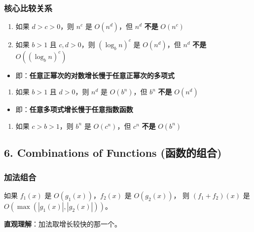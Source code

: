 \documentclass[10pt,a4paper,openany]{ctexbook}
\theoremstyle{definition}
\theoremstyle{remark}
\renewenvironment{quote}
  {\list{}{\leftmargin=1em\rightmargin=0pt\topsep=0.5pt\partopsep=0pt}\item[]}
  {\endlist}
\begin{document}
\subsubsection{核心比较关系}

\begin{enumerate}
\item 如果 $d > c > 0$，则 $n^c$ 是 $O(n^d)$，但 $n^d$ \textbf{不是} $O(n^c)$
\item 如果 $b > 1$ 且 $c, d > 0$，则 $(\log_b n)^c$ 是 $O(n^d)$，但 $n^d$ \textbf{不是} $O((\log_b n)^c)$
\end{enumerate}

\begin{itemize}
\item 即：\textbf{任意正幂次的对数增长慢于任意正幂次的多项式}
\end{itemize}

\begin{enumerate}
\item 如果 $b > 1$ 且 $d > 0$，则 $n^d$ 是 $O(b^n)$，但 $b^n$ \textbf{不是} $O(n^d)$
\end{enumerate}

\begin{itemize}
\item 即：\textbf{任意多项式增长慢于任意指数函数}
\end{itemize}

\begin{enumerate}
\item 如果 $c > b > 1$，则 $b^n$ 是 $O(c^n)$，但 $c^n$ \textbf{不是} $O(b^n)$

\end{enumerate}

\vspace{-2pt}

\subsection{6. Combinations of Functions (函数的组合)}

\subsubsection{加法组合}

\begin{quote}
如果 $f_1(x)$ 是 $O(g_1(x))$，$f_2(x)$ 是 $O(g_2(x))$，
则 $(f_1 + f_2)(x)$ 是 $O(\max(|g_1(x)|, |g_2(x)|))$。

\textbf{直观理解}：加法取增长较快的那一个。

\end{quote}
\end{document}
